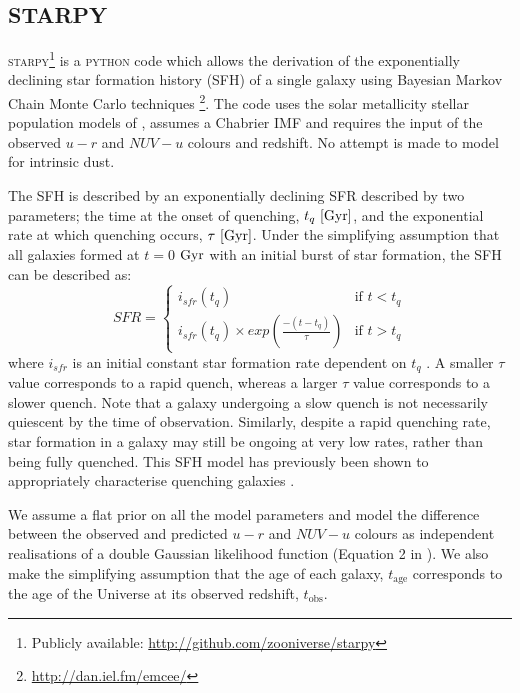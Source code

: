 \documentclass[useAMS,usenatbib]{mn2e}
\begin{document}
\subsection{STARPY}\label{sec:starpy}

\textsc{starpy}\footnote{Publicly available: \url{http://github.com/zooniverse/starpy}} is a \textsc{python} code which allows the derivation of the exponentially declining star formation history (SFH) of a single galaxy using  Bayesian Markov Chain Monte Carlo techniques \citep{emcee13}\footnote{\url{http://dan.iel.fm/emcee/}}. The code uses the solar metallicity stellar population models of \cite[][hereafter BC03]{BC03}, assumes a Chabrier IMF \citep{chabrier03} and requires the input of the observed $u-r$ and $NUV-u$ colours and redshift. No attempt is made to model for intrinsic dust. 

The SFH is described by an exponentially declining SFR described by two parameters; the time at the onset of quenching, $t_q~\rm{[Gyr]}$, and the exponential rate at which quenching occurs, $\tau~\rm{[Gyr]}$. Under the simplifying assumption that all galaxies formed at $t=0$ $\rm{ Gyr}$ with an initial burst of star formation, the SFH can be described as: 
\begin{equation}\label{sfh}
SFR =
\begin{cases}
i_{sfr}(t_q) & \text{if } t < t_q \\
i_{sfr}(t_q) \times exp{\left( \frac{-(t-t_{q})}{\tau}\right)} & \text{if } t > t_q 
\end{cases}
\end{equation}
where $i_{sfr}$ is an initial constant star formation rate dependent on $t_q$ \citep{schawinski14, smethurst15}.  A smaller $\tau$ value corresponds to a rapid quench, whereas a larger $\tau$ value corresponds to a slower quench. Note that a galaxy undergoing a slow quench is not necessarily quiescent by the time of observation. Similarly, despite a rapid quenching rate, star formation in a galaxy may still be ongoing at very low rates, rather than being fully quenched. This SFH model has previously been shown to appropriately characterise quenching galaxies \citep{Weiner06, Martin07, Noeske07,schawinski14}. 

We assume a flat prior on all the model parameters and model the difference between the observed and predicted $u-r$ and $NUV-u$ colours as independent realisations of a double Gaussian likelihood function (Equation 2 in \citealt{smethurst15}). We also make the simplifying assumption that the age of each galaxy, $t_\mathrm{age}$ corresponds to the age of the Universe at its observed redshift, $t_\mathrm{obs}$.
\end{document}
